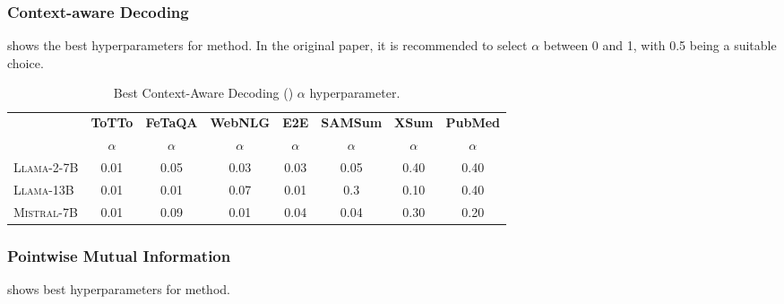 \subsubsection{Context-aware Decoding}  shows the best hyperparameters for \cad method. In the original paper, it is recommended to select \( \alpha \) between 0 and 1, with 0.5 being a suitable choice.
\begin{table}[ht]
\centering

\begin{tabular}{lccccccc}
    & \textbf{ToTTo} & \textbf{FeTaQA} & \textbf{WebNLG} & \textbf{E2E} & \textbf{SAMSum} & \textbf{XSum} & \textbf{PubMed} \\
    & $\alpha$ & $\alpha$ & $\alpha$ & $\alpha$ & $\alpha$ & $\alpha$ & $\alpha$ \\
    \midrule
    \textsc{Llama-2-7B} & 0.01 & 0.05 & 0.03 & 0.03 & 0.05 & 0.40 & 0.40 \\
    \textsc{Llama-13B}   & 0.01 & 0.01 & 0.07 & 0.01 & 0.3 & 0.10 & 0.40 \\
    \textsc{Mistral-7B}  & 0.01 & 0.09 & 0.01 & 0.04 & 0.04 & 0.30 & 0.20 \\
    \midrule
\end{tabular}

\caption{Best Context-Aware Decoding (\cad) $\alpha$ hyperparameter.}
\label{tab:cad-hyperparameter}
\end{table}

\subsubsection{Pointwise Mutual Information}
 shows best hyperparameters for \pmi method.
\begin{table}[h!]
\centering
{}
\caption{Best PMI Decoding (\pmi) $(\lambda, \tau)$ hyperparameters.}
\label{tab:pmi-hyperparameter}
\end{table}


